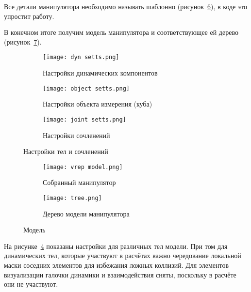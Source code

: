 \documentclass[14pt]{extarticle}
\begin{document}
    Все детали манипулятора необходимо называть шаблонно (рисунок~\ref{pic:tree}), в коде это упростит работу.

    В конечном итоге получим модель манипулятора и соответствующее ей дерево (рисунок~\ref{pic:man result}).

    \begin{figure}[H]
        \centering
        \begin{subfigure}{0.5\linewidth}
            \texttt{[image: dyn setts.png]}
            \caption{Настройки динамических компонентов}
            \label{pic:dyn setts}
        \end{subfigure}%
        \begin{subfigure}{0.5\linewidth}
            \centering
            \texttt{[image: object setts.png]}
            \caption{Настройки объекта измерения (куба)}
            \label{pic:cube setts}
        \end{subfigure}
        \begin{subfigure}{0.5\linewidth}
            \centering
            \texttt{[image: joint setts.png]}
            \caption{Настройки сочленений}
            \label{pic:joint setts}
        \end{subfigure}
        \caption{Настройки тел и сочленений}
        \label{pic:settings}
    \end{figure}

    \begin{figure}
        \centering
        \begin{subfigure}{0.5\linewidth}
            \texttt{[image: vrep model.png]}
            \caption{Собранный манипулятор}
            \label{pic:vrep man}
        \end{subfigure}%
        \begin{subfigure}{0.5\linewidth}
            \centering
            \texttt{[image: tree.png]}
            \caption{Дерево модели манипулятора}
            \label{pic:tree}
        \end{subfigure}
        \caption{Модель}
        \label{pic:man result}
    \end{figure}

    На рисунке~\ref{pic:settings} показаны настройки для различных тел модели. При том для динамических тел, которые
    участвуют в расчётах важно чередование локальной маски соседних элементов для избежания ложных коллизий. Для
    элементов визуализации галочки динамики и взаимодействия сняты, поскольку в расчёте они не участвуют.
\end{document}
